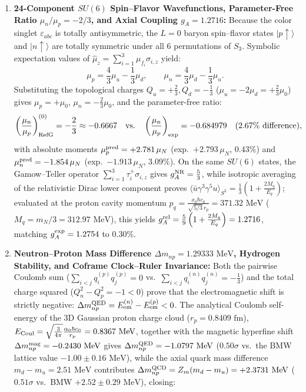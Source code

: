\documentclass[11pt,a4paper]{article}
\begin{document}
\begin{enumerate}[label=\arabic*.]
\item \textbf{24-Component $SU(6)$ Spin--Flavor Wavefunctions, Parameter-Free Ratio $\mu_n/\mu_p = -2/3$, and Axial Coupling $g_A = 1.2716$:} Because the color singlet $\varepsilon_{abc}$ is totally antisymmetric, the $L=0$ baryon spin--flavor states $|p\uparrow\rangle$ and $|n\uparrow\rangle$ are totally symmetric under all $6$ permutations of $S_3$. Symbolic expectation values of $\hat{\mu}_z = \sum_{i=1}^3 \mu_{f_i}\sigma_{i,z}$ yield:
\begin{equation}
\mu_p = \frac{4}{3}\mu_u - \frac{1}{3}\mu_d, \qquad \mu_n = \frac{4}{3}\mu_d - \frac{1}{3}\mu_u.
\end{equation}
Substituting the topological charges $Q_u = +\frac{2}{3}, Q_d = -\frac{1}{3}$ ($\mu_u = -2\mu_d = +\frac{2}{3}\mu_0$) gives $\mu_p = +\mu_0$, $\mu_n = -\frac{2}{3}\mu_0$, and the parameter-free ratio:
\begin{equation}
\left(\frac{\mu_n}{\mu_p}\right)_{\rm RefG}^{(0)} = -\frac{2}{3} \approx -0.6667 \quad\text{vs.}\quad \left(\frac{\mu_n}{\mu_p}\right)_{\rm exp} = -0.684979 \quad (2.67\%\text{ difference}),
\end{equation}
with absolute moments $\mu_p^{\rm pred} = +2.781\,\mu_N$ (exp.\ $+2.793\,\mu_N$, $0.43\%$) and $\mu_n^{\rm pred} = -1.854\,\mu_N$ (exp.\ $-1.913\,\mu_N$, $3.09\%$). On the same $SU(6)$ states, the Gamow--Teller operator $\sum_{i=1}^3 \tau_i^+\sigma_{i,z}$ gives $g_A^{\rm NR} = \frac{5}{3}$, while isotropic averaging of the relativistic Dirac lower component proves $\langle\bar{u}\gamma^3\gamma^5 u\rangle_{S^2} = \frac{1}{3}\left(1 + \frac{2 M_q}{E_q}\right)$; evaluated at the proton cavity momentum $p_q = \frac{x_0\hbar c_0}{\sqrt{5/3}\,r_p} = 371.32\text{ MeV}$ ($M_q = m_N/3 = 312.97\text{ MeV}$), this yields \textbf{$g_A^{\rm rel} = \frac{5}{9}\left(1 + \frac{2 M_q}{E_q}\right) = 1.2716$}, matching $g_A^{\rm exp} = 1.2754$ to \textbf{$0.30\%$}.
\item \textbf{Neutron--Proton Mass Difference $\Delta m_{np} = 1.29333\text{ MeV}$, Hydrogen Stability, and Coframe Clock--Ruler Invariance:} Both the pairwise Coulomb sum ($\sum_{i<j}q_i^{(p)}q_j^{(p)} = 0$ vs.\ $\sum_{i<j}q_i^{(n)}q_j^{(n)} = -\frac{1}{3}$) and the total charge squared ($Q_n^2 - Q_p^2 = -1 < 0$) prove that the electromagnetic shift is strictly negative: $\Delta m_{np}^{\rm QED} = E_{\rm em}^{(n)} - E_{\rm em}^{(p)} < 0$. The analytical Coulomb self-energy of the 3D Gaussian proton charge cloud ($r_p = 0.8409\text{ fm}$), $E_{\rm Coul} = \sqrt{\frac{3}{4\pi}}\frac{\alpha_0\hbar c_0}{r_p} = 0.8367\text{ MeV}$, together with the magnetic hyperfine shift $\Delta m_{np}^{\rm mag} = -0.2430\text{ MeV}$ gives $\Delta m_{np}^{\rm QED} = -1.0797\text{ MeV}$ ($0.50\sigma$ vs.\ the BMW lattice value $-1.00 \pm 0.16\text{ MeV}$), while the axial quark mass difference $m_d - m_u = 2.51\text{ MeV}$ contributes $\Delta m_{np}^{\rm QCD} = Z_m(m_d - m_u) = +2.3731\text{ MeV}$ ($0.51\sigma$ vs.\ BMW $+2.52 \pm 0.29\text{ MeV}$), closing:

\end{enumerate}
\end{document}
